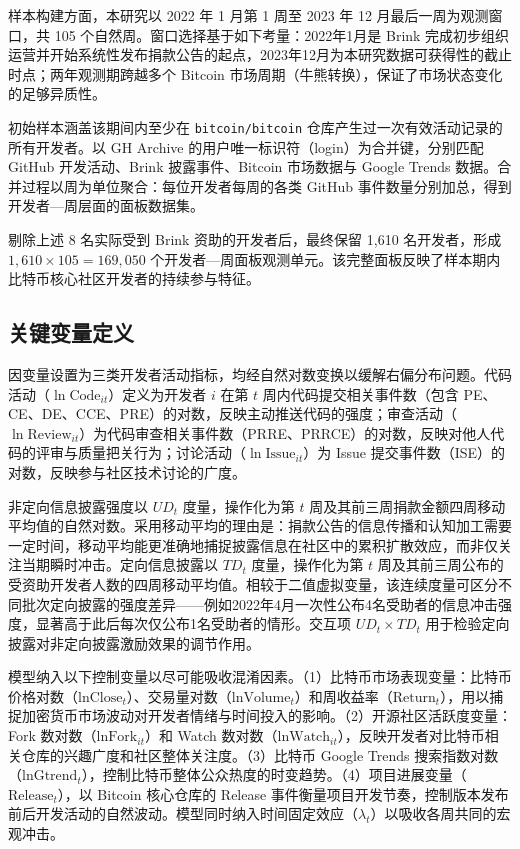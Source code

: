 样本构建方面，本研究以 2022 年 1 月第 1 周至 2023 年 12 月最后一周为观测窗口，共 105 个自然周。窗口选择基于如下考量：2022年1月是 Brink 完成初步组织运营并开始系统性发布捐款公告的起点，2023年12月为本研究数据可获得性的截止时点；两年观测期跨越多个 Bitcoin 市场周期（牛熊转换），保证了市场状态变化的足够异质性。

初始样本涵盖该期间内至少在 \texttt{bitcoin/bitcoin} 仓库产生过一次有效活动记录的所有开发者。以 GH Archive 的用户唯一标识符（login）为合并键，分别匹配 GitHub 开发活动、Brink 披露事件、Bitcoin 市场数据与 Google Trends 数据。合并过程以周为单位聚合：每位开发者每周的各类 GitHub 事件数量分别加总，得到开发者—周层面的面板数据集。

剔除上述 8 名实际受到 Brink 资助的开发者后，最终保留 1,610 名开发者，形成 $1{,}610 \times 105 = 169{,}050$ 个开发者—周面板观测单元。该完整面板反映了样本期内比特币核心社区开发者的持续参与特征。

\subsection{关键变量定义}

因变量设置为三类开发者活动指标，均经自然对数变换以缓解右偏分布问题。代码活动（$\ln\text{Code}_{it}$）定义为开发者 $i$ 在第 $t$ 周内代码提交相关事件数（包含 PE、CE、DE、CCE、PRE）的对数，反映主动推送代码的强度；审查活动（$\ln\text{Review}_{it}$）为代码审查相关事件数（PRRE、PRRCE）的对数，反映对他人代码的评审与质量把关行为；讨论活动（$\ln\text{Issue}_{it}$）为 Issue 提交事件数（ISE）的对数，反映参与社区技术讨论的广度。

非定向信息披露强度以 $UD_t$ 度量，操作化为第 $t$ 周及其前三周捐款金额四周移动平均值的自然对数。采用移动平均的理由是：捐款公告的信息传播和认知加工需要一定时间，移动平均能更准确地捕捉披露信息在社区中的累积扩散效应，而非仅关注当期瞬时冲击。定向信息披露以 $TD_t$ 度量，操作化为第 $t$ 周及其前三周公布的受资助开发者人数的四周移动平均值。相较于二值虚拟变量，该连续度量可区分不同批次定向披露的强度差异——例如2022年4月一次性公布4名受助者的信息冲击强度，显著高于此后每次仅公布1名受助者的情形。交互项 $UD_t \times TD_t$ 用于检验定向披露对非定向披露激励效果的调节作用。

模型纳入以下控制变量以尽可能吸收混淆因素。（1）比特币市场表现变量：比特币价格对数（$\text{lnClose}_t$）、交易量对数（$\text{lnVolume}_t$）和周收益率（$\text{Return}_t$），用以捕捉加密货币市场波动对开发者情绪与时间投入的影响。（2）开源社区活跃度变量：Fork 数对数（$\text{lnFork}_{it}$）和 Watch 数对数（$\text{lnWatch}_{it}$），反映开发者对比特币相关仓库的兴趣广度和社区整体关注度。（3）比特币 Google Trends 搜索指数对数（$\text{lnGtrend}_t$），控制比特币整体公众热度的时变趋势。（4）项目进展变量（$\text{Release}_t$），以 Bitcoin 核心仓库的 Release 事件衡量项目开发节奏，控制版本发布前后开发活动的自然波动。模型同时纳入时间固定效应（$\lambda_t$）以吸收各周共同的宏观冲击。

